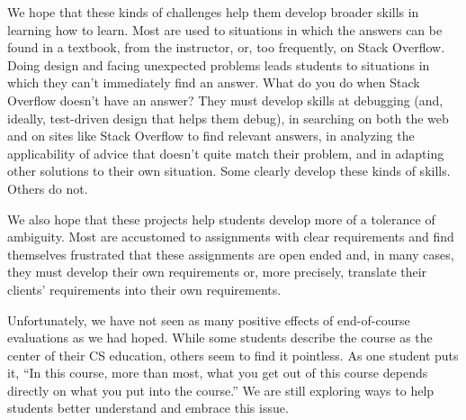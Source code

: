 We hope that these kinds of challenges help them develop broader
skills in learning how to learn.  Most are used to situations in
which the answers can be found in a textbook, from the instructor,
or, too frequently, on Stack Overflow.  Doing design and facing 
unexpected problems leads students to situations in
which they can't immediately find an answer.  What do you do when
Stack Overflow doesn't have an answer?  They must develop skills
at debugging (and, ideally, test-driven design that helps them
debug), in searching on both the web and on sites like Stack Overflow
to find relevant answers, in analyzing the applicability of advice
that doesn't quite match their problem, and in adapting other
solutions to their own situation.  Some clearly develop these kinds
of skills.  Others do not.

We also hope that these projects help students develop more of a
tolerance of ambiguity.  Most are accustomed to assignments with
clear requirements and find themselves frustrated that these 
assignments are open ended and, in many cases, they must develop
their own requirements or, more precisely, translate their clients'
requirements into their own requirements.

Unfortunately, we have not seen as many positive effects of
end-of-course evaluations as we had hoped.  While some students
describe the course as the center of their CS education, others
seem to find it pointless.  As one student puts it, ``In this course,
more than most, what you get out of this course depends directly
on what you put into the course.''  We are still exploring ways to
help students better understand and embrace this issue.


